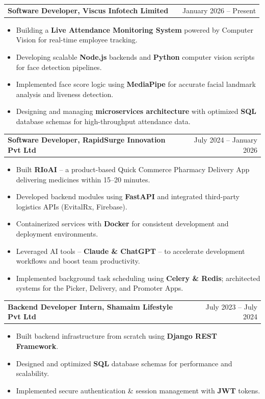 \documentclass[a4paper,11pt]{article}
\makeatletter
\newenvironment{joblong}[2]
    {
    \begin{tabularx}{\linewidth}{@{}l X r@{}}
    \textbf{#1} & \hfill &  #2 \\[4pt]
    \end{tabularx}
    \begin{minipage}[t]{\linewidth}
    \begin{itemize}[nosep,after=\strut, leftmargin=1em, itemsep=3pt,label=--]
    }
    {
    \end{itemize}
    \end{minipage}
    }
\makeatother
\begin{document}
\begin{joblong}{Software Developer, Viscus Infotech Limited}{January 2026 -- Present}
\item Building a \textbf{Live Attendance Monitoring System} powered by Computer Vision for real-time employee tracking.
\item Developing scalable \textbf{Node.js} backends and \textbf{Python} computer vision scripts for face detection pipelines.
\item Implemented face score logic using \textbf{MediaPipe} for accurate facial landmark analysis and liveness detection.
\item Designing and managing \textbf{microservices architecture} with optimized \textbf{SQL} database schemas for high-throughput attendance data.
\end{joblong}

\vspace{6pt}

\begin{joblong}{Software Developer, RapidSurge Innovation Pvt Ltd}{July 2024 -- January 2026}
\item Built \textbf{RIoAI} -- a product-based Quick Commerce Pharmacy Delivery App delivering medicines within 15--20 minutes.
\item Developed backend modules using \textbf{FastAPI} and integrated third-party logistics APIs (EvitalRx, Firebase).
\item Containerized services with \textbf{Docker} for consistent development and deployment environments.
\item Leveraged AI tools -- \textbf{Claude \& ChatGPT} -- to accelerate development workflows and boost team productivity.
\item Implemented background task scheduling using \textbf{Celery \& Redis}; architected systems for the Picker, Delivery, and Promoter Apps.
\end{joblong}

\vspace{6pt}

\begin{joblong}{Backend Developer Intern, Shamaim Lifestyle Pvt Ltd}{July 2023 -- July 2024}
\item Built backend infrastructure from scratch using \textbf{Django REST Framework}.
\item Designed and optimized \textbf{SQL} database schemas for performance and scalability.
\item Implemented secure authentication \& session management with \textbf{JWT} tokens.
\end{joblong}
\end{document}
